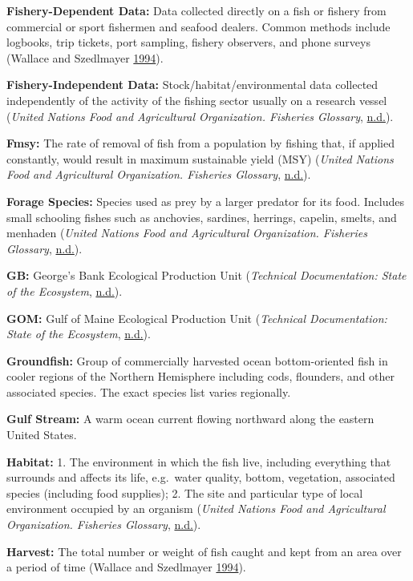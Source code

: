 \documentclass[
]{book}
\begin{document}
\textbf{Fishery-Dependent Data:}
Data collected directly on a fish or fishery from commercial or sport fishermen and seafood dealers. Common methods include logbooks, trip tickets, port sampling, fishery observers, and phone surveys (Wallace and Szedlmayer \protect\hyperlink{ref-wallace1994}{1994}).

\textbf{Fishery-Independent Data:}
Stock/habitat/environmental data collected independently of the activity of the fishing sector usually on a research vessel (\emph{United Nations Food and Agricultural Organization. Fisheries Glossary}, \protect\hyperlink{ref-unfao}{n.d.}).

\textbf{Fmsy:}
The rate of removal of fish from a population by fishing that, if applied constantly, would result in maximum sustainable yield (MSY) (\emph{United Nations Food and Agricultural Organization. Fisheries Glossary}, \protect\hyperlink{ref-unfao}{n.d.}).

\textbf{Forage Species:}
Species used as prey by a larger predator for its food. Includes small schooling fishes such as anchovies, sardines, herrings, capelin, smelts, and menhaden (\emph{United Nations Food and Agricultural Organization. Fisheries Glossary}, \protect\hyperlink{ref-unfao}{n.d.}).

\textbf{GB:}
George's Bank Ecological Production Unit (\emph{Technical Documentation: State of the Ecosystem}, \protect\hyperlink{ref-techdoc}{n.d.}).

\textbf{GOM:}
Gulf of Maine Ecological Production Unit (\emph{Technical Documentation: State of the Ecosystem}, \protect\hyperlink{ref-techdoc}{n.d.}).

\textbf{Groundfish:}
Group of commercially harvested ocean bottom-oriented fish in cooler regions of the Northern Hemisphere including cods, flounders, and other associated species. The exact species list varies regionally.

\textbf{Gulf Stream:}
A warm ocean current flowing northward along the eastern United States.

\textbf{Habitat:}
1. The environment in which the fish live, including everything that surrounds and affects its life, e.g.~water quality, bottom, vegetation, associated species (including food supplies); 2. The site and particular type of local environment occupied by an organism (\emph{United Nations Food and Agricultural Organization. Fisheries Glossary}, \protect\hyperlink{ref-unfao}{n.d.}).

\textbf{Harvest:}
The total number or weight of fish caught and kept from an area over a period of time (Wallace and Szedlmayer \protect\hyperlink{ref-wallace1994}{1994}).
\end{document}
